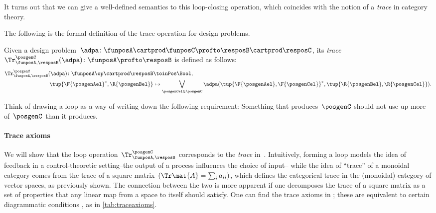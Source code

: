 It turns out that we can give a well-defined semantics to this loop-closing operation, which coincides with the notion of a \emph{trace} in category theory.

The following is the formal definition of the trace operation for design problems.


\begin{definition}
    \label{def:dp-trace}
    Given a design problem~$\adpa\colon \funposA \cartprod \funposC \profto \resposB \cartprod \resposC$, its \emph{trace}~$\Tr_{\funposA,\resposB}^\posgenC(\adpa) \colon \funposA \profto \resposB$ is defined as follows:
    \begin{equation}
        \label{eq:tracedef}
        \begin{aligned}
            \Tr_{\funposA,\resposB}^\posgenC(\adpa) \colon  \funposA\op \cartprod \resposB &\toinPos \Bool, \\
            \tup{\F{\posgenAel}^*, \R{\posgenBel}} &\mapsto \bigvee_{\posgenCel \in \posgenC}
            \adpa(\tup{\F{\posgenAel}, \F{\posgenCel}}^*,
            \tup{\R{\posgenBel}, \R{\posgenCel}}).
        \end{aligned}
    \end{equation}
\end{definition}


Think of drawing a loop as a way of writing down the following requirement: Something that produces~$\posgenC$ should not use up more of~$\posgenC$ than it produces.


\paragraph{Trace axioms}
We will show that the loop operation~$\Tr_{\funposA,\resposB}^\posgenC$ corresponds to the \emph{trace} in~\DP.
Intuitively, forming a loop models the idea of feedback in a control-theoretic setting--the output of a process influences the choice of input--
while the idea of ``trace'' of a monoidal category comes from the trace of a square matrix~$(\Tr\mat{A} = \sum_i a_{ii})$, which defines the categorical trace in the (monoidal) category of vector spaces, as previously shown.
The connection between the two is more apparent if one decomposes the trace of a square matrix as a set of properties that any linear map from a space to itself should satisfy.
One can find the trace axioms in  \cite{mac2013categories};
these are equivalent to certain diagrammatic conditions \cite{joyal96}, as in \cref{tab:traceaxioms}.


